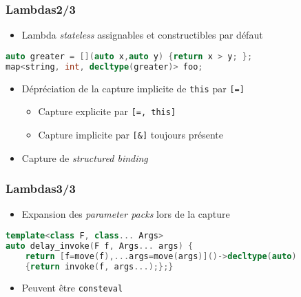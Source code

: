 \documentclass[C++.tex]{subfiles}
\begin{document}
\begin{frame}[fragile]
	\frametitle{Lambdas\titlehfill{}2/3}
	\begin{itemize}
		\item Lambda \textit{stateless} assignables et constructibles par défaut

	\end{itemize}

	\begin{lstlisting}[language=C++]
auto greater = [](auto x,auto y) {return x > y; };
map<string, int, decltype(greater)> foo;\end{lstlisting}

	\begin{itemize}
		\item Dépréciation de la capture implicite de \lstinline|this| par \lstinline|[=]|
		\begin{itemize}
			\item Capture explicite par \lstinline|[=, this]|


			\item Capture implicite par \lstinline|[&]| toujours présente
		\end{itemize}
		\item Capture de \textit{structured binding}
	\end{itemize}
\end{frame}

\begin{frame}[fragile]
	\frametitle{Lambdas\titlehfill{}3/3}
	\begin{itemize}
		\item Expansion des \textit{parameter packs} lors de la capture
	\end{itemize}

	\begin{lstlisting}[language=C++]
template<class F, class... Args>
auto delay_invoke(F f, Args... args) {
	return [f=move(f),...args=move(args)]()->decltype(auto) 
	{return invoke(f, args...);};}\end{lstlisting}

	\begin{itemize}
		\item Peuvent être \lstinline|consteval|
	\end{itemize}
\end{frame}
\end{document}
